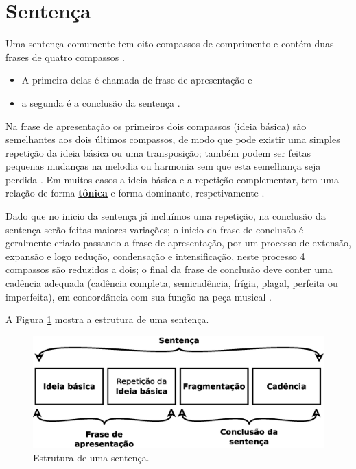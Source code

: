 \section{Sentença}
\label{sec:sentence}
Uma sentença comumente tem oito compassos de comprimento e 
contém duas frases de quatro compassos \cite[pp. 48]{schoenberg1990fundamentos} \cite[pp. 21]{schoenberg1967fundamentals}.

\begin{itemize}
\item A primeira delas é chamada de frase de apresentação  e 
\item a segunda é a conclusão da sentença  \cite[pp. 58]{schoenberg1990fundamentos} \cite[pp. 58]{schoenberg1967fundamentals}.

\end{itemize}

Na frase de apresentação os primeiros dois compassos (ideia básica) são semelhantes aos dois últimos compassos,
de modo que pode existir uma simples repetição da ideia básica ou uma transposição;
também podem ser feitas pequenas mudanças na melodia ou harmonia sem que esta semelhança seja perdida \cite[pp. 48]{schoenberg1990fundamentos} \cite[pp. 21]{schoenberg1967fundamentals}.
Em muitos casos a ideia básica e a repetição complementar, tem uma relação de
forma \hyperref[sec:Tonica]{\textbf{tônica}} e forma dominante, 
respetivamente \cite[pp. 49]{schoenberg1990fundamentos} \cite[pp. 21]{schoenberg1967fundamentals}.

Dado que no inicio da sentença já incluímos uma repetição,
na conclusão da sentença serão feitas maiores variações;
o inicio da frase de conclusão é geralmente criado passando a frase de apresentação,
por um processo de extensão, expansão e logo redução, condensação e intensificação, 
neste processo 4 compassos são reduzidos a dois;
o final da frase de conclusão deve conter uma cadência adequada 
(cadência completa, semicadência, frígia, plagal, perfeita ou imperfeita),
em concordância com sua função na peça musical
\cite[pp. 59-59]{schoenberg1990fundamentos} \cite[pp. 58-59]{schoenberg1967fundamentals}.

A Figura \ref{fig:sentencestruct} mostra a estrutura de uma sentença. 
\begin{figure}[!h]
  \centering
    \includegraphics[width=\textwidth]{chapters/cap-musica-composer/sentencia.eps}
\caption{Estrutura de uma sentença.}
\label{fig:sentencestruct}
\end{figure}





